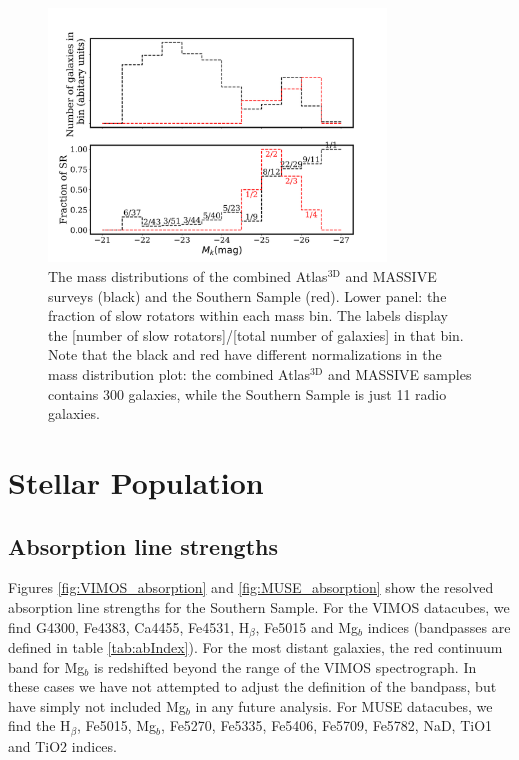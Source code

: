 		

		\begin{figure}
			\centering
			\includegraphics[width=0.8\textwidth]{chapter4/M_k_binned.png}
			\caption[Upper panel: Mass matching global kinematics]{The mass distributions of the combined Atlas$^\text{3D}$ and MASSIVE surveys (black) and the Southern Sample (red). Lower panel: the fraction of slow rotators within each mass bin. The labels display the [number of slow rotators]/[total number of galaxies] in that bin. Note that the black and red have different normalizations in the mass distribution plot: the combined Atlas$^\text{3D}$ and MASSIVE samples contains 300 galaxies, while the Southern Sample is just 11 radio galaxies.}
			\label{fig:SRmassFraction}
		\end{figure}


		


 


\section{Stellar Population}
	\label{sec:pop}

	\subsection{Absorption line strengths}
		\label{subsec:absorption}
		Figures \ref{fig:VIMOS_absorption} and \ref{fig:MUSE_absorption} show the resolved absorption line strengths for the Southern Sample. For the VIMOS datacubes, we find G4300, Fe4383, Ca4455, Fe4531, H$_\beta$, Fe5015 and Mg$_b$ indices (bandpasses are defined in table \ref{tab:abIndex}). For the most distant galaxies, the red continuum band for Mg$_b$ is redshifted beyond the range of the VIMOS spectrograph. In these cases we have not attempted to adjust the definition of the bandpass, but have simply not included Mg$_b$ in any future analysis. For MUSE datacubes, we find the H$_\beta$, Fe5015, Mg$_b$, Fe5270, Fe5335, Fe5406, Fe5709, Fe5782, NaD, TiO1 and TiO2 indices. 


